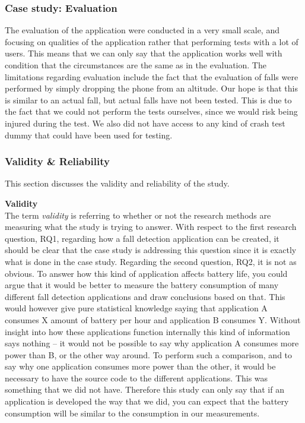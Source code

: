 \documentclass[12pt, a4paper, onecolumn]{article}
\newcommand{\parag}[1]{
	\textbf{#1} \hspace{0pt} \\
}
\begin{document}
	\subsubsection{Case study: Evaluation}
	
	The evaluation of the application were conducted in a very small scale, and focusing on qualities of the application rather that performing tests with a lot of users. This means that we can only say that the application works well with condition that the circumstances are the same as in the evaluation. The limitations regarding evaluation include the fact that the evaluation of falls were performed by simply dropping the phone from an altitude. Our hope is that this is similar to an actual fall, but actual falls have not been tested. This is due to the fact that we could not perform the tests ourselves, since we would risk being injured during the test. We also did not have access to any kind of crash test dummy that could have been used for testing.
	
	\subsubsection{Validity \& Reliability}
	
	This section discusses the validity and reliability of the study.
	
	\parag{Validity}
	The term \textit{validity} is referring to whether or not the research methods are measuring what the study is trying to answer. With respect to the first research question, RQ1, regarding how a fall detection application can be created, it should be clear that the case study is addressing this question since it is exactly what is done in the case study. Regarding the second question, RQ2, it is not as obvious. To answer how this kind of application affects battery life, you could argue that it would be better to measure the battery consumption of many different fall detection applications and draw conclusions based on that. This would however give pure statistical knowledge saying that application A consumes X amount of battery per hour and application B consumes Y. Without insight into how these applications function internally this kind of information says nothing -- it would not be possible to say why application A consumes more power than B, or the other way around. To perform such a comparison, and to say why one application consumes more power than the other, it would be necessary to have the source code to the different applications. This was something that we did not have. Therefore this study can only say that if an application is developed the way that we did, you can expect that the battery consumption will be similar to the consumption in our measurements.
	
\end{document}

